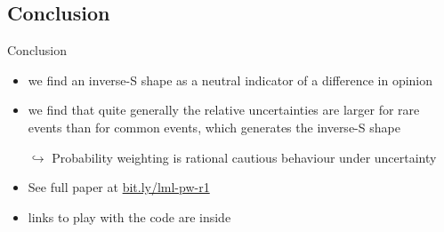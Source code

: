 \subsection{Conclusion}

\begin{frame}{Conclusion}
\begin{itemize}
  \item we find an inverse-S shape as a neutral indicator of a difference in opinion
	\item we find that quite generally the relative uncertainties are larger for rare events than for common events, which generates the inverse-S shape
  
  \item[$\hookrightarrow$] Probability weighting is rational cautious behaviour under uncertainty
  \item[]
  \item See full paper at \url{bit.ly/lml-pw-r1}
  \item links to play with the code are inside
\end{itemize}

\end{frame}
